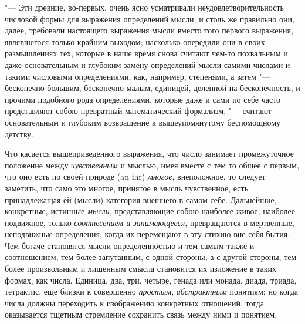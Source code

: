 "--- Эти древние, во-первых, очень ясно усматривали неудовлетворительность
числовой формы для выражения определений мысли, и столь же правильно они,
далее, требовали настоящего выражения мысли вместо того первого выражения,
являвшегося только крайним выходом; насколько опередили они в своих
размышлениях тех, которые в наше время снова считают чем-то похвальным и
даже основательным и глубоким замену определений мысли самими числами и
такими числовыми определениями, как, например, степенями, а затем
"--- бесконечно большим, бесконечно малым, единицей, деленной на
бесконечность, и прочими подобного рода
определениями, которые даже и сами по
себе часто представляют собою превратный математический формализм, "---
считают основательным и глубоким возвращение к вышеупомянутому беспомощному
детству.

Что касается вышеприведенного выражения, что число занимает промежуточное
положение между {\em чувственным} и мыслью, имея вместе
с тем то общее с первым, что оно есть по своей природе (an ihr)
{\em многое}, внеположное, то следует заметить, что
само это многое, принятое в мысль чувственное, есть принадлежащая ей
(мысли) категория внешнего в самом себе. Дальнейшие, конкретные, истинные
{\em мысли}, представляющие собою наиболее живое,
наиболее подвижное, только {\em соотнесением и
занимающееся}, превращаются в мертвенные, неподвижные определения, когда их
перемещают в эту стихию вне-себя-бытия. Чем богаче становятся мысли
определенностью и тем самым также и соотношением, тем более запутанным, с
одной стороны, а с другой стороны, тем более произвольным и лишенным смысла
становится их изложение в таких формах, как числа. Единица, два, три,
четыре, генада или монада, диада, триада, тетрактис, еще близки к
совершенно {\em простым},
{\em абстрактным} понятиям; но когда числа должны
переходить к изображению конкретных отношений, тогда оказывается тщетным
стремление сохранить связь между ними и понятием.

